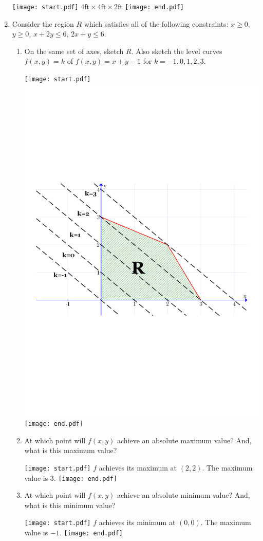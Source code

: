 \documentclass[12pt]{article}
\begin{document}
\begin{enumerate}
\texttt{[image: start.pdf]}
{{$4 \text{ft}\times 4\text{ft} \times 2 \text{ft}$}}
\texttt{[image: end.pdf]}


\item Consider the region $R$ which satisfies all of the following constraints: $x \geq 0$, $y \geq 0$, $x+2y \leq 6$, $2x+y\leq 6$.

\begin{enumerate}

\item On the same set of axes, sketch $R$.  Also sketch the level curves $f(x,y)=k$ of $f(x,y)=x+y-1$ for $k=-1,0,1,2,3$.

\texttt{[image: start.pdf]}
{{\includegraphics[scale=0.4]{max.pdf}}}
\texttt{[image: end.pdf]}


\item At which point will $f(x,y)$ achieve an absolute maximum value?  And, what is this maximum value?

\texttt{[image: start.pdf]}
{{$f$ achieves its maximum at $(2,2)$.  The maximum value is $3$.}}
\texttt{[image: end.pdf]}


\item At which point will $f(x,y)$ achieve an absolute minimum value?  And, what is this minimum value?

\texttt{[image: start.pdf]}
{{$f$ achieves its minimum at $(0,0)$.  The maximum value is $-1$.}}
\texttt{[image: end.pdf]}


\end{enumerate}

\end{enumerate}
\end{document}
